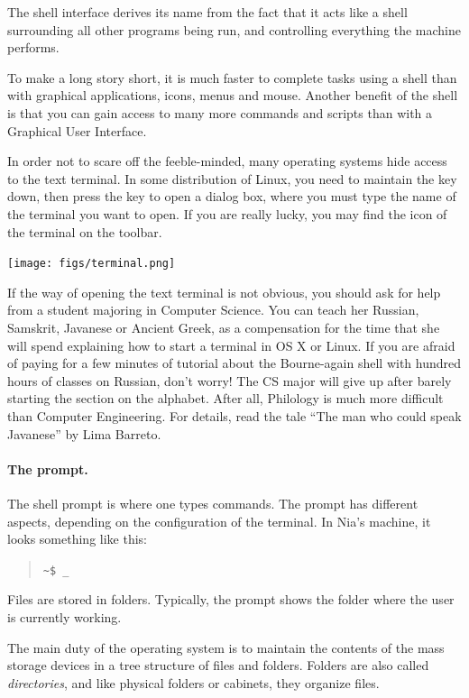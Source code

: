\documentclass[a4paper,12pt]{book}
\begin{document}
The shell interface derives its name from
the fact that it acts like a shell
surrounding all other programs being run,
and controlling everything the machine performs.

To make a long story short,
it is much faster to complete tasks
using a shell than with graphical applications,
icons, menus and mouse. Another benefit of the
shell is that you can gain access to many
more commands and scripts than with
a Graphical User Interface.

In order not to scare off the feeble-minded,
many operating systems hide access
to the text terminal. In some distribution
of Linux, you need to maintain the  key
down, then press the  key to open a
dialog box, where you must type the
name of the terminal you want to open.
If you are really lucky, you may find
the icon of the terminal  on the
toolbar.

\texttt{[image: figs/terminal.png]}

If the way of opening the text terminal
is not obvious, you should ask for help
from a student majoring in Computer Science.
You can teach her Russian, Samskrit, Javanese
or Ancient Greek, as a compensation
for the time that she will spend explaining
how to start a terminal in 
OS X or Linux. If you are afraid
of paying for a few minutes of tutorial
about the Bourne-again shell
with hundred hours of classes on
Russian, don't worry! The CS
major will give up after barely
starting the section on the alphabet. After all,
Philology is much more difficult
than Computer Engineering.
For details, read the tale ``The man who could speak
Javanese'' by Lima Barreto.

\paragraph{The prompt.} 
The shell prompt
is where one types commands. The prompt
has different aspects, depending on the
configuration of the terminal.
In Nia's machine, it looks something like this:
\begin{quote}
\verb|~$ _|
\end{quote}
Files are stored in folders. Typically, the
prompt shows the folder where the user is
currently working.

The main duty of the
operating system is to maintain the contents of
the mass storage devices in a tree structure
of files and folders.
Folders are also called {\em directories},
and like physical folders or cabinets,
they organize files.
\end{document}
